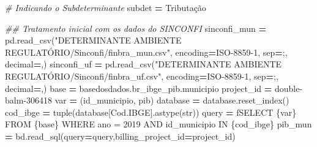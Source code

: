 \documentclass[
  12,
  dvipsnames]{article}
\newenvironment{Shaded}{\begin{snugshade}}{\end{snugshade}}
\newcommand{\BuiltInTok}[1]{#1}
\newcommand{\CommentTok}[1]{\textcolor[rgb]{0.56,0.35,0.01}{\textit{#1}}}
\newcommand{\NormalTok}[1]{#1}
\newcommand{\OperatorTok}[1]{\textcolor[rgb]{0.81,0.36,0.00}{\textbf{#1}}}
\newcommand{\SpecialCharTok}[1]{\textcolor[rgb]{0.00,0.00,0.00}{#1}}
\newcommand{\SpecialStringTok}[1]{\textcolor[rgb]{0.31,0.60,0.02}{#1}}
\newcommand{\StringTok}[1]{\textcolor[rgb]{0.31,0.60,0.02}{#1}}
\begin{document}
\begin{Shaded}
\begin{Highlighting}[]
\CommentTok{\# Indicando o Subdeterminante}
\NormalTok{subdet }\OperatorTok{=} \StringTok{\textquotesingle{}Tributação\textquotesingle{}}

\CommentTok{\#\# Tratamento inicial com os dados do SINCONFI}
\NormalTok{sinconfi\_mun }\OperatorTok{=}\NormalTok{ pd.read\_csv(}\StringTok{"DETERMINANTE AMBIENTE REGULATÓRIO/Sinconfi/finbra\_mun.csv"}\NormalTok{,}
\NormalTok{                           encoding}\OperatorTok{=}\StringTok{\textquotesingle{}ISO{-}8859{-}1\textquotesingle{}}\NormalTok{, sep}\OperatorTok{=}\StringTok{\textquotesingle{};\textquotesingle{}}\NormalTok{, decimal}\OperatorTok{=}\StringTok{\textquotesingle{},\textquotesingle{}}\NormalTok{)}
\NormalTok{sinconfi\_uf }\OperatorTok{=}\NormalTok{ pd.read\_csv(}\StringTok{"DETERMINANTE AMBIENTE REGULATÓRIO/Sinconfi/finbra\_uf.csv"}\NormalTok{,}
\NormalTok{                          encoding}\OperatorTok{=}\StringTok{\textquotesingle{}ISO{-}8859{-}1\textquotesingle{}}\NormalTok{, sep}\OperatorTok{=}\StringTok{\textquotesingle{};\textquotesingle{}}\NormalTok{, decimal}\OperatorTok{=}\StringTok{\textquotesingle{},\textquotesingle{}}\NormalTok{)}
\NormalTok{base }\OperatorTok{=} \StringTok{\textquotesingle{}\textasciigrave{}basedosdados.br\_ibge\_pib.municipio\textasciigrave{}\textquotesingle{}}
\NormalTok{project\_id }\OperatorTok{=} \StringTok{\textquotesingle{}double{-}balm{-}306418\textquotesingle{}}
\NormalTok{var }\OperatorTok{=}\NormalTok{ (}\StringTok{\textquotesingle{}id\_municipio, pib\textquotesingle{}}\NormalTok{)}
\NormalTok{database }\OperatorTok{=}\NormalTok{ database.reset\_index()}
\NormalTok{cod\_ibge }\OperatorTok{=} \BuiltInTok{tuple}\NormalTok{(database[}\StringTok{\textquotesingle{}Cod.IBGE\textquotesingle{}}\NormalTok{].astype(}\BuiltInTok{str}\NormalTok{))}
\NormalTok{query }\OperatorTok{=} \SpecialStringTok{f\textquotesingle{}SELECT }\SpecialCharTok{\{}\NormalTok{var}\SpecialCharTok{\}}\SpecialStringTok{ FROM }\SpecialCharTok{\{}\NormalTok{base}\SpecialCharTok{\}}\SpecialStringTok{ WHERE ano = 2019 AND id\_municipio IN }\SpecialCharTok{\{}\NormalTok{cod\_ibge}\SpecialCharTok{\}}\SpecialStringTok{\textquotesingle{}}
\NormalTok{pib\_mun }\OperatorTok{=}\NormalTok{ bd.read\_sql(query}\OperatorTok{=}\NormalTok{query,billing\_project\_id}\OperatorTok{=}\NormalTok{project\_id)}


\end{Highlighting}
\end{Shaded}
\end{document}
